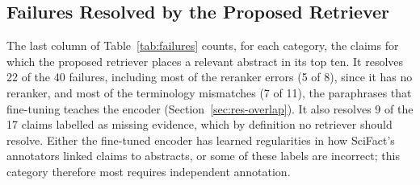 \subsection{Failures Resolved by the Proposed Retriever}
\label{sec:fail-repaired}

The last column of Table~\ref{tab:failures} counts, for each category, the claims for which the
proposed retriever places a relevant abstract in its top ten. It resolves 22 of the 40 failures,
including most of the reranker errors (5 of 8), since it has no reranker, and most of the
terminology mismatches (7 of 11), the paraphrases that fine-tuning teaches the encoder
(Section~\ref{sec:res-overlap}). It also resolves 9 of the 17 claims labelled as missing
evidence, which by definition no retriever should resolve. Either the fine-tuned encoder has
learned regularities in how SciFact's annotators linked claims to abstracts, or some of these
labels are incorrect; this category therefore most requires independent annotation.
